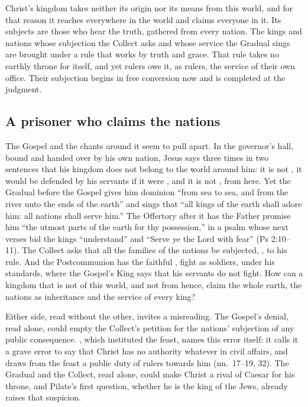 
Christ's kingdom takes neither its origin nor its means from this world, and
for that reason it reaches everywhere in the world and claims everyone in it. Its subjects are those who hear the truth, gathered from every
nation. The kings and nations whose subjection the Collect asks and whose
service the Gradual sings are brought under a rule that works by truth and
grace. That rule takes no earthly throne for itself, and yet rulers owe it, as
rulers, the service of their own office. Their subjection begins in free
conversion now and is completed at the judgment.

\subsection{A prisoner who claims the nations}
\label{sec:hence-question}

The Gospel and the chants around it seem to pull apart. In the governor's
hall, bound and handed over by his own nation, Jesus says three times in two
sentences that his kingdom does not belong to the world around him: it is not
, it would be defended by his servants if it were
, and it is not , from here. Yet the Gradual
before the Gospel gives him dominion ``from sea to sea, and from the river
unto the ends of the earth'' and sings that ``all kings of the earth shall
adore him: all nations shall serve him.'' The Offertory after it has the Father
promise him ``the utmost parts of the earth for thy possession,'' in a psalm
whose next verses bid the kings ``understand'' and ``Serve ye the Lord with
fear'' (Ps 2:10--11). The Collect asks that all the families of the nations be
subjected, , to his rule. And the Postcommunion has the
faithful , fight as soldiers, under his standards, where the
Gospel's King says that his servants do not fight. How can a kingdom that is
not of this world, and not from hence, claim the whole earth, the nations as
inheritance and the service of every king?

Either side, read without the other, invites a misreading. The
Gospel's denial, read alone, could empty the Collect's petition for the
nations' subjection of any public consequence. , which
instituted the feast, names this error itself: it calls it a grave error to
say that Christ has no authority whatever in civil affairs, and draws from the
feast a public duty of rulers towards him (nn.~17--19, 32). The Gradual and the
Collect, read alone, could make Christ a rival of Caesar for his throne, and
Pilate's first question, whether he is the king of the Jews, already raises
that suspicion.

